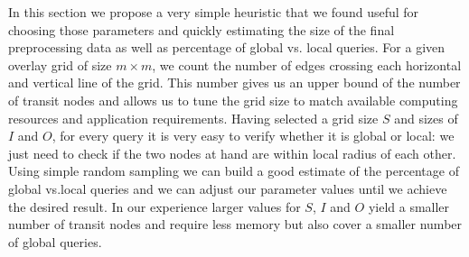In this section we propose a very simple heuristic that we found useful for choosing those
parameters and quickly estimating the size of the final preprocessing data as well as percentage of
global vs. local queries.  For a given overlay grid of size $m \times m$, we count the number of
edges crossing each horizontal and vertical line of the grid.  This number gives us  an upper bound
of the number of transit nodes and allows us to tune the grid size to match available computing
resources and application requirements.  Having selected a grid size $S$ and sizes of $I$ and $O$,
for every query it is very easy to verify whether it is global or local: we just need to check if
the two nodes at hand are within local radius of each other.  Using simple random sampling we can
build a good estimate of the percentage of global vs.local queries and we can adjust our parameter
values until we achieve the desired result.  In our experience larger values for $S$, $I$ and $O$
yield a smaller number of transit nodes and require less memory but also cover a
smaller number of global queries.
